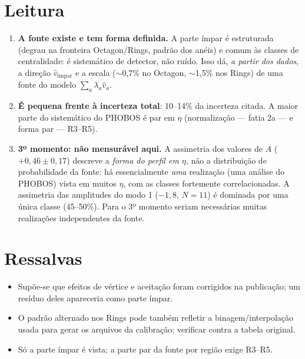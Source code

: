 \documentclass[11pt,a4paper]{article}
\begin{document}
\section*{Leitura}
\begin{enumerate}
\item \textbf{A fonte existe e tem forma definida.} A parte ímpar é estruturada (degrau na fronteira Octagon/Rings, padrão dos anéis)
e comum às classes de centralidade: é sistemático de detector, não ruído. Isso dá, \emph{a partir dos dados}, a direção $\hat v_{\mathrm{ímpar}}$
e a escala ($\sim$0,7\% no Octagon, $\sim$1,5\% nos Rings) de uma fonte do modelo $\sum_a\lambda_a\hat v_a$.
\item \textbf{É pequena frente à incerteza total}: 10--14\% da incerteza citada. A maior parte do sistemático do PHOBOS é par em $\eta$
(normalização --- fatia 2a --- e forma par --- R3--R5).
\item \textbf{3º momento: não mensurável aqui.} A assimetria dos valores de $A$ ($+0{,}46\pm0{,}17$) descreve a \emph{forma do perfil em $\eta$},
não a distribuição de probabilidade da fonte: há essencialmente \emph{uma} realização (uma análise do PHOBOS) vista em muitos $\eta$, com as
classes fortemente correlacionadas. A assimetria das amplitudes do modo 1 ($-1{,}8$, $N=11$) é dominada por uma única classe (45--50\%).
Para o 3º momento seriam necessárias muitas realizações independentes da fonte.
\end{enumerate}

\section*{Ressalvas}
\begin{itemize}[nosep]
\item Supõe-se que efeitos de vértice e aceitação foram corrigidos na publicação; um resíduo deles apareceria como parte ímpar.
\item O padrão alternado nos Rings pode também refletir a binagem/interpolação usada para gerar os arquivos da calibração; verificar contra a tabela original.
\item Só a parte ímpar é vista; a parte par da fonte por região exige R3--R5.
\end{itemize}
\end{document}
